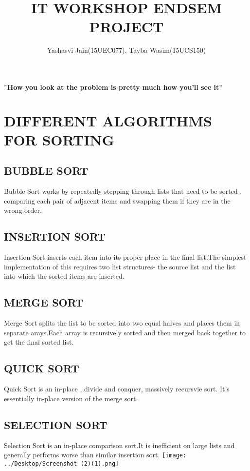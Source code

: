 \documentclass{IEEEtran}
\author{Yashasvi Jain(15UEC077), Tayba Wasim(15UCS150)} %
\title{IT WORKSHOP ENDSEM PROJECT } %
\begin{document}
\maketitle


\begin{center}
\begin{LARGE}
\textbf{"How you look at the problem is pretty much how you'll see it"}\\
\end{LARGE}
\end{center}

\section{DIFFERENT ALGORITHMS FOR SORTING}
\label{sec:BUBBLE SORT}

\subsection{BUBBLE SORT}
Bubble Sort works by repeatedly stepping through lists that
need to be sorted , comparing each pair of adjacent items
and swapping them if they are in the wrong order.


\subsection{INSERTION SORT}

Insertion Sort inserts each item into its proper place in the
final list.The simplest implementation of this requires two
list structures- the source list and the list into which the
sorted items are inserted.


\subsection{MERGE SORT}
Merge Sort splits the list to be sorted into two equal halves
and places them in separate arays.Each array is recursively
sorted and then merged back together to get the final sorted list.

\subsection{QUICK SORT}
Quick Sort is an in-place , divide and conquer, massively
recursvie sort. It’s essentially in-place version of the merge
sort.
\subsection{SELECTION SORT}
Selection Sort is an in-place comparison sort.It is inefficient
on large lists and generally performs worse than similar
insertion sort.
\texttt{[image: ../Desktop/Screenshot (2)(1).png]}
\end{document}
